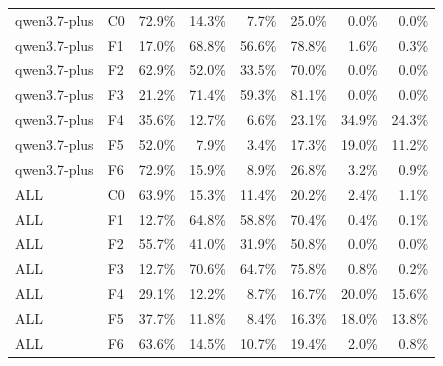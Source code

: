 \begin{tabular}{llrrrrrr}
qwen3.7-plus & C0 & 72.9\% & 14.3\% & 7.7\% & 25.0\% & 0.0\% & 0.0\% \\
qwen3.7-plus & F1 & 17.0\% & 68.8\% & 56.6\% & 78.8\% & 1.6\% & 0.3\% \\
qwen3.7-plus & F2 & 62.9\% & 52.0\% & 33.5\% & 70.0\% & 0.0\% & 0.0\% \\
qwen3.7-plus & F3 & 21.2\% & 71.4\% & 59.3\% & 81.1\% & 0.0\% & 0.0\% \\
qwen3.7-plus & F4 & 35.6\% & 12.7\% & 6.6\% & 23.1\% & 34.9\% & 24.3\% \\
qwen3.7-plus & F5 & 52.0\% & 7.9\% & 3.4\% & 17.3\% & 19.0\% & 11.2\% \\
qwen3.7-plus & F6 & 72.9\% & 15.9\% & 8.9\% & 26.8\% & 3.2\% & 0.9\% \\
ALL & C0 & 63.9\% & 15.3\% & 11.4\% & 20.2\% & 2.4\% & 1.1\% \\
ALL & F1 & 12.7\% & 64.8\% & 58.8\% & 70.4\% & 0.4\% & 0.1\% \\
ALL & F2 & 55.7\% & 41.0\% & 31.9\% & 50.8\% & 0.0\% & 0.0\% \\
ALL & F3 & 12.7\% & 70.6\% & 64.7\% & 75.8\% & 0.8\% & 0.2\% \\
ALL & F4 & 29.1\% & 12.2\% & 8.7\% & 16.7\% & 20.0\% & 15.6\% \\
ALL & F5 & 37.7\% & 11.8\% & 8.4\% & 16.3\% & 18.0\% & 13.8\% \\
ALL & F6 & 63.6\% & 14.5\% & 10.7\% & 19.4\% & 2.0\% & 0.8\% \\
\bottomrule
\end{tabular}

